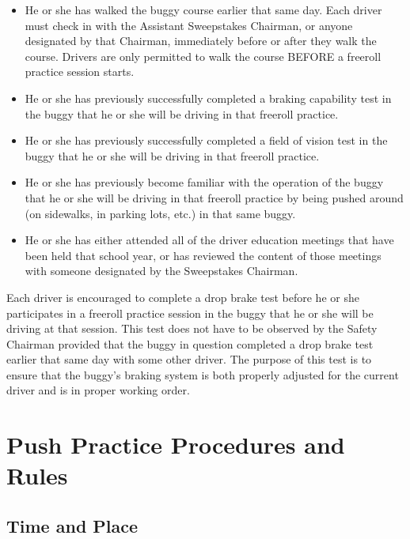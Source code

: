 	\begin{itemize}

		\item
		He or she has walked the buggy course earlier that same day. Each driver must
		check in with the Assistant Sweepstakes Chairman, or anyone designated by that
		Chairman, immediately before or after they walk the course. Drivers are only
		permitted to walk the course BEFORE a freeroll practice session starts.

		\item
		He or she has previously successfully completed a braking capability test in
		the buggy that he or she will be driving in that freeroll practice.

		\item
		He or she has previously successfully completed a field of vision test in the
		buggy that he or she will be driving in that freeroll practice.

		\item
		He or she has previously become familiar with the operation of the buggy that
		he or she will be driving in that freeroll practice by being pushed around (on
		sidewalks, in parking lots, etc.) in that same buggy.

		\item
		He or she has either attended all of the driver education meetings that have
		been held that school year, or has reviewed the content of those meetings with
		someone designated by the Sweepstakes Chairman.

	\end{itemize}
	
	Each driver is encouraged to complete a drop brake test before he or she
	participates in a freeroll practice session in the buggy that he or she will be
	driving at that session. This test does not have to be observed by the Safety
	Chairman provided that the buggy in question completed a drop brake test
	earlier that same day with some other driver. The purpose of this test is to
	ensure that the buggy's braking system is both properly adjusted for the
	current driver and is in proper working order.
	
\section{Push Practice Procedures and Rules}

\subsection{Time and Place}

